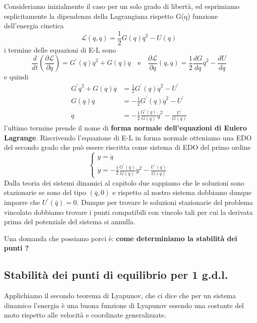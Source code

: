 Consideriamo inizialmente il caso per un solo grado di libert\`{a}, ed esprimiamo esplicitamente la dipendenza della Lagrangiana rispetto G(q) funzione dell'energia cinetica
\begin{equation}
	\mathcal{L}(q,\dot{q}) = \frac{1}{2}G(q)\dot{q}^2 - U(q)
\end{equation}
i termine delle equazioni di E-L sono 
\begin{equation}
	\frac{d}{d t}\left(\frac{\partial \mathcal{L}}{\partial \dot{q}}\right)=G^{\prime}(q) \dot{q}^2+G(q) \ddot{q}  \quad \text{e} \quad 
	\frac{\partial \mathcal{L}}{\partial q}(q, \dot{q})=\frac{1}{2} \frac{d G}{d q} \dot{q}^2-\frac{d U}{d q}
\end{equation}
e quindi 
\begin{equation}
\begin{aligned}
G^{\prime} \dot{q}^2+G(q) \ddot{q} & =\frac{1}{2} G^{\prime}(q) \dot{q}^2-U^{\prime} \\
G(q) \ddot{q} & =-\frac{1}{2} G^{\prime}(q) \dot{q}^2-U^{\prime} \\
\ddot{q} & =-\frac{1}{2} \frac{G^{\prime}(q)}{G(q)} \dot{q}^2-\frac{U^{\prime}}{ G\left (q \right)}
\end{aligned}
\end{equation}
l'ultimo termine prende il nome di \textbf{forma normale dell'equazioni di Eulero Lagrange}. Riscrivendo l'equazione di E-L in forma normale otteniamo una EDO del secondo grado che pu\`{o} essere riscritta come sistema di EDO del primo ordine 
\begin{equation}
\left\{\begin{array}{l}
y=\dot{q} \\
\dot{y}=-\frac{1}{2} \frac{G^{\prime}(q)}{G(q)} y^2-\frac{U^{\prime}(q)}{G(q)}
\end{array}\right.
\end{equation}
Dalla teoria dei sistemi dinamici al capitolo due sappiamo che le soluzioni sono stazionarie se sono del tipo $(\bar{q},0)$ e rispetto al nostro sistema dobbiamo dunque imporre che $U^{\prime} (\bar{q}) = 0$. Dunque per trovare le soluzioni stazionarie del problema vincolato dobbiamo trovare i punti compatibili con vincolo tali per cui la derivata prima del potenziale del sistema si annulla.
\newline

\noindent Una domanda che possiamo porci \`{e}: \textbf{come determiniamo la stabilit\`{a} dei punti ?}
\subsection{Stabilit\`{a} dei punti di equilibrio per 1 g.d.l.}
 Applichiamo il secondo teorema di Lyapunov, che ci dice che per un sistema dinamico l'energia \`{e} una buona funzione di Lyapunov essendo una costante del moto rispetto alle velocit\`{a} e coordinate generalizzate.
 
